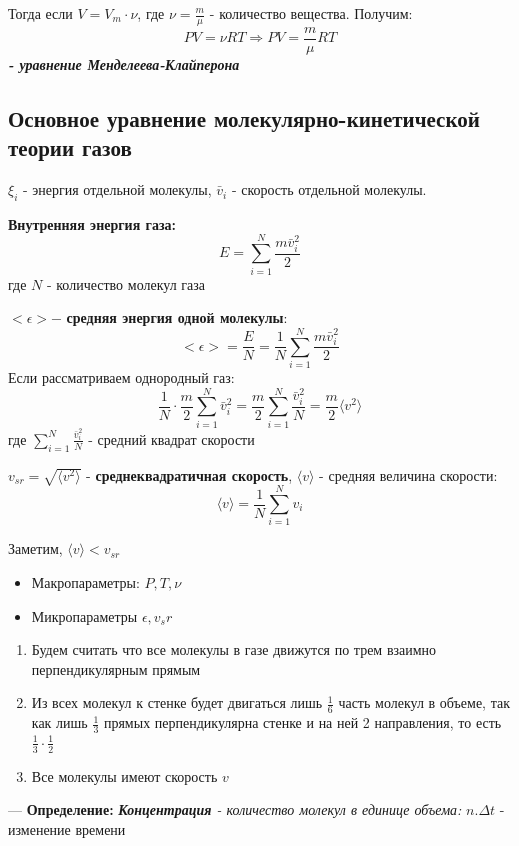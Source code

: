 \documentclass[12pt,a4paper]{report}
\begin{document}
\vspace{5px}

Тогда если $V = V_m \cdot \nu$, где $\nu = \frac{m}{\mu}$ - количество вещества. Получим:
\[ PV = \nu R T \Rightarrow PV = \frac{m}{\mu} R T \]
\textit{\textbf{- уравнение Менделеева-Клайперона}}


\subsection{Основное уравнение молекулярно-кинетической теории газов}

$\xi_i$ - энергия отдельной молекулы, $\bar v_i$ - скорость отдельной молекулы.

\vspace{6px}

\textbf{Внутренняя энергия газа:} \[ E = \sum_{i = 1}^N \frac{m \bar v_i^2}{2}\] где $N$ - количество молекул газа

\vspace{6px}

$<\epsilon> - $ \textbf{средняя энергия одной молекулы}:
\[ <\epsilon> = \frac{E}{N} = \frac{1}{N} \sum_{i = 1}^N \frac{m \bar v_i^2}{2} \]
Если рассматриваем однородный газ:
\[ \frac{1}{N} \cdot \frac{m}{2} \sum_{i = 1}^N {\bar v_i^2} = \frac{m}{2} \sum_{i = 1}^N \frac{\bar v_i^2}{N} = \frac{m}{2} \langle v^2 \rangle\]
где $\sum_{i = 1}^N \frac{\bar v_i^2}{N}$ - средний квадрат скорости

\vspace{6px}

$v_{sr} = \sqrt{\langle v^2 \rangle}$ - \textbf{среднеквадратичная скорость}, $\langle v \rangle$ - средняя величина скорости: \[ \langle v \rangle = \frac{1}{N}\sum_{i = 1}^N {v_i} \]

Заметим, $\langle v \rangle < v_{sr}$

\vspace{6px}
\begin{itemize}
    \item Макропараметры: $P, T ,\nu$
    \item Микропараметры $\epsilon, v_sr$
\end{itemize}

\begin{enumerate}
    \item Будем считать что все молекулы в газе движутся по трем взаимно перпендикулярным прямым
    \item Из всех молекул к стенке будет двигаться лишь $\frac{1}{6}$ часть молекул в объеме, так как лишь $\frac{1}{3}$ прямых перпендикулярна стенке и на ней 2 направления, то есть $\frac{1}{3} \cdot \frac{1}{2}$
    \item Все молекулы имеют скорость $v$
\end{enumerate}
--- \textbf{Определение:} \textit{\textbf{Концентрация} - количество молекул в единице объема:} $n. \Delta t$ - изменение времени
\end{document}
